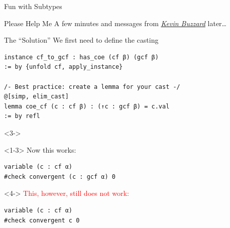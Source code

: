 \documentclass{beamer}
\begin{document}
\begin{frame}[fragile]{Fun with Subtypes}
\begin{onlyenv}
{    
}
\end{onlyenv}
\end{frame}
\begin{frame}{Please Help Me}
    \center A few minutes and messages from \href{http://wwwf.imperial.ac.uk/~buzzard/}{\emph{Kevin Buzzard}} later\dots
\end{frame}
\begin{frame}[fragile]{The ``Solution''}
We first need to define the casting
\pause
\begin{verbatim}
instance cf_to_gcf : has_coe (cf β) (gcf β)
:= by {unfold cf, apply_instance}

/- Best practice: create a lemma for your cast -/
@[simp, elim_cast]
lemma coe_cf (c : cf β) : (↑c : gcf β) = c.val
:= by refl
\end{verbatim}
\begin{visibleenv}<3->
\begin{onlyenv}<1-3>
\alert{Now this works:}
\begin{verbatim}
variable (c : cf α)
#check convergent (c : gcf α) 0
\end{verbatim}
\end{onlyenv}
\begin{onlyenv}<4->
\textcolor{red}{This, however, still does not work:}
\begin{verbatim}
variable (c : cf α)
#check convergent c 0
\end{verbatim}
\end{onlyenv}
\end{visibleenv}
\end{frame}
\end{document}
